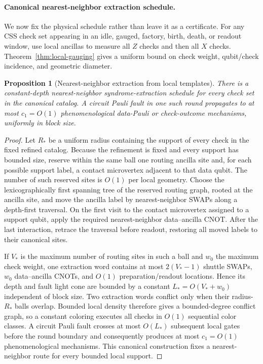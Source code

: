 \documentclass[aps,prx,reprint,superscriptaddress,nofootinbib,floatfix,longbibliography]{revtex4-2}
\newtheorem{proposition}[theorem]{Proposition}
\theoremstyle{definition}
\begin{document}
\paragraph{Canonical nearest-neighbor extraction schedule.}
We now fix the physical schedule rather than leave it as a certificate.  For
any CSS check set appearing in an idle, gauged, factory, birth, death, or
readout window, use local ancillas to measure all $Z$ checks and then all $X$
checks.  Theorem~\ref{thm:local-gauging} gives a uniform bound on
check weight, qubit/check incidence, and geometric diameter.

\begin{proposition}[Nearest-neighbor extraction from local templates]
\label{prop:nn-extraction}
There is a constant-depth nearest-neighbor syndrome-extraction schedule for
every check set in the canonical catalog.  A circuit Pauli fault in one such
round propagates to at most $c_1=O(1)$ phenomenological data-Pauli or
check-outcome mechanisms, uniformly in block size.
\end{proposition}
\begin{proof}
Let $R_*$ be a uniform radius containing the support of every check in the
fixed refined catalog.  Because the refinement is fixed and every support has
bounded size, reserve within the same ball one routing ancilla site and, for
each possible support label, a contact microvertex adjacent to that data qubit.
The number of such reserved sites is $O(1)$ per local geometry.  Choose the
lexicographically first spanning tree of the reserved routing graph, rooted at
the ancilla site, and move the ancilla label by nearest-neighbor SWAPs along a
depth-first traversal.  On the first visit to the contact microvertex assigned
to a support qubit, apply the required nearest-neighbor data--ancilla CNOT.
After the last interaction, retrace the traversal before readout, restoring all
moved labels to their canonical sites.

If $V_*$ is the maximum number of routing sites in such a ball and $w_0$ the
maximum check weight, one extraction word contains at most $2(V_*-1)$ shuttle
SWAPs, $w_0$ data--ancilla CNOTs, and $O(1)$ preparation/readout locations.
Hence its depth and fault light cone are bounded by a constant
$L_*=O(V_*+w_0)$ independent of block size.  Two extraction words conflict
only when their radius-$R_*$ balls overlap.  Bounded local density therefore
gives a bounded-degree conflict graph, so a constant coloring executes all
checks in $O(1)$ sequential color classes.  A circuit Pauli fault crosses at
most $O(L_*)$ subsequent local gates before the round boundary and consequently
produces at most $c_1=O(1)$ phenomenological mechanisms.  This canonical
construction fixes a nearest-neighbor route for every bounded local support.
\end{proof}
\end{document}
